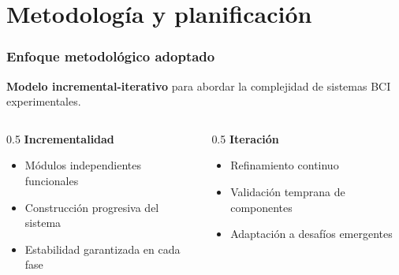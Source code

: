\documentclass[10pt,thmsa]{beamer}
\theoremstyle{plain}
\begin{document}
\section{Metodología y planificación}

\begin{frame}
\frametitle{Enfoque metodológico adoptado}

\textbf{Modelo incremental-iterativo} para abordar la complejidad de sistemas BCI experimentales.

\vspace{1em}

\begin{columns}
\begin{column}{0.5\textwidth}
\textbf{Incrementalidad}
\begin{itemize}
\item Módulos independientes funcionales
\item Construcción progresiva del sistema
\item Estabilidad garantizada en cada fase
\end{itemize}
\end{column}

\begin{column}{0.5\textwidth}
\textbf{Iteración}
\begin{itemize}
\item Refinamiento continuo
\item Validación temprana de componentes
\item Adaptación a desafíos emergentes
\end{itemize}
\end{column}
\end{columns}

\end{frame}
\end{document}
